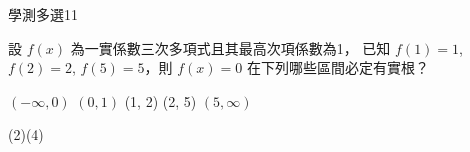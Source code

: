 \begin{QUESTIONS}
\begin{QUESTION}
        \begin{ExamInfo}{96}{學測}{多選}{11}
        \end{ExamInfo}
        \begin{ExamAnsRateInfo}{22}{35}{16}{15}
        \end{ExamAnsRateInfo}
        \begin{QBODY}
            設 $f(x)$ 為一實係數三次多項式且其最高次項係數為1， 已知 $f(1)=1$, $f(2)=2$, $f(5)=5$，則 $f(x) = 0$ 在下列哪些區間必定有實根？ 
			\begin{QOPS} 
				\QOP $(-\infty , 0)$ 
				\QOP  $(0, 1)$ 
				\QOP (1, 2) 
				\QOP (2, 5) 
				\QOP $(5, \infty)$ 
			\end{QOPS}
        \end{QBODY}
        \begin{QFROMS}
        \end{QFROMS}
        \begin{QTAGS}\end{QTAGS}
        \begin{QANS}
            (2)(4)
        \end{QANS}
        \begin{QSOLLIST}
        \end{QSOLLIST}
        \begin{QEMPTYSPACE}
        \end{QEMPTYSPACE}
    \end{QUESTION}
\end{QUESTIONS}
